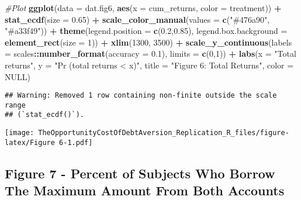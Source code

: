 \documentclass[
]{article}
\newenvironment{Shaded}{\begin{snugshade}}{\end{snugshade}}
\newcommand{\AttributeTok}[1]{\textcolor[rgb]{0.13,0.29,0.53}{#1}}
\newcommand{\CommentTok}[1]{\textcolor[rgb]{0.56,0.35,0.01}{\textit{#1}}}
\newcommand{\ConstantTok}[1]{\textcolor[rgb]{0.56,0.35,0.01}{#1}}
\newcommand{\DecValTok}[1]{\textcolor[rgb]{0.00,0.00,0.81}{#1}}
\newcommand{\FloatTok}[1]{\textcolor[rgb]{0.00,0.00,0.81}{#1}}
\newcommand{\FunctionTok}[1]{\textcolor[rgb]{0.13,0.29,0.53}{\textbf{#1}}}
\newcommand{\NormalTok}[1]{#1}
\newcommand{\SpecialCharTok}[1]{\textcolor[rgb]{0.81,0.36,0.00}{\textbf{#1}}}
\newcommand{\StringTok}[1]{\textcolor[rgb]{0.31,0.60,0.02}{#1}}
\begin{document}
\begin{Shaded}
\begin{Highlighting}[]
\CommentTok{\#Plot}
\FunctionTok{ggplot}\NormalTok{(}\AttributeTok{data =}\NormalTok{ dat.fig6, }\FunctionTok{aes}\NormalTok{(}\AttributeTok{x =}\NormalTok{ cum\_returns, }\AttributeTok{color =}\NormalTok{ treatment)) }\SpecialCharTok{+}
  \FunctionTok{stat\_ecdf}\NormalTok{(}\AttributeTok{size =} \FloatTok{0.65}\NormalTok{) }\SpecialCharTok{+}
  \FunctionTok{scale\_color\_manual}\NormalTok{(}\AttributeTok{values =} \FunctionTok{c}\NormalTok{(}\StringTok{"\#476a90"}\NormalTok{, }\StringTok{"\#a33f49"}\NormalTok{)) }\SpecialCharTok{+}
  \FunctionTok{theme}\NormalTok{(}\AttributeTok{legend.position =} \FunctionTok{c}\NormalTok{(}\FloatTok{0.2}\NormalTok{,}\FloatTok{0.85}\NormalTok{), }\AttributeTok{legend.box.background =} \FunctionTok{element\_rect}\NormalTok{(}\AttributeTok{size =} \DecValTok{1}\NormalTok{)) }\SpecialCharTok{+}
  \FunctionTok{xlim}\NormalTok{(}\DecValTok{1300}\NormalTok{, }\DecValTok{3500}\NormalTok{) }\SpecialCharTok{+}
  \FunctionTok{scale\_y\_continuous}\NormalTok{(}\AttributeTok{labels =}\NormalTok{ scales}\SpecialCharTok{::}\FunctionTok{number\_format}\NormalTok{(}\AttributeTok{accuracy =} \FloatTok{0.1}\NormalTok{), }\AttributeTok{limits =} \FunctionTok{c}\NormalTok{(}\DecValTok{0}\NormalTok{,}\DecValTok{1}\NormalTok{)) }\SpecialCharTok{+}
  \FunctionTok{labs}\NormalTok{(}\AttributeTok{x =} \StringTok{"Total returns"}\NormalTok{, }\AttributeTok{y =} \StringTok{"Pr (total returns \textless{} x)"}\NormalTok{, }\AttributeTok{title =} \StringTok{"Figure 6: Total Returns"}\NormalTok{, }\AttributeTok{color =} \ConstantTok{NULL}\NormalTok{)}
\end{Highlighting}
\end{Shaded}

\begin{verbatim}
## Warning: Removed 1 row containing non-finite outside the scale range
## (`stat_ecdf()`).
\end{verbatim}

\texttt{[image: TheOpportunityCostOfDebtAversion\_Replication\_R\_files/figure-latex/Figure 6-1.pdf]}

\subsection{Figure 7 - Percent of Subjects Who Borrow The Maximum Amount
From Both
Accounts}\label{figure-7---percent-of-subjects-who-borrow-the-maximum-amount-from-both-accounts}
\end{document}
